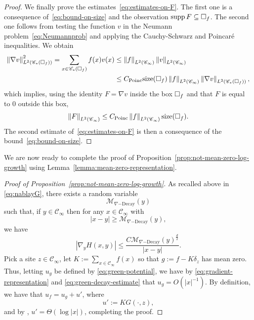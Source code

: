 \documentclass[12pt]{amsart}
\numberwithin{equation}{section}
\begin{document}
\begin{proof}
		We finally prove the estimates~\eqref{eq:estimates-on-F}. The first one is a consequence of~\eqref{eq:bound-on-size} and the observation $\mathrm{supp\,} F \subseteq \square_f$. The second one follows from testing the function $v$ in the Neumann problem~\eqref{eq:Neumannprob} and applying the Cauchy-Schwarz and Poincar\'e inequalities. We obtain
		\begin{align*}
			\left\| \nabla v \right\|_{L^2 ( \mathscr{C}_*(\square_f))}^2  = \sum_{x \in \mathscr{C}_*(\square_f)} f(x) v(x) 
			& \leq \left\| f \right\|_{L^2(\mathscr{C}_\infty)} \left\| v \right\|_{L^2(\mathscr{C}_\infty)} \\
			& \leq  C_{\mathrm{Poinc}} \mathrm{size}(\square_f) \left\| f \right\|_{L^2(\mathscr{C}_\infty)} \left\| \nabla v \right\|_{L^2 ( \mathscr{C}_*(\square_f))},
		\end{align*}
		which implies, using the identity $F = \nabla v$ inside the box $\square_f$ and that $F$ is equal to $0$ outside this box,
		\begin{equation*}
			\left\| F \right\|_{L^2 ( \mathscr{C}_\infty)} \leq C_{\mathrm{Poinc}} \left\| f \right\|_{L^2(\mathscr{C}_\infty)}\mathrm{size}(\square_f).
		\end{equation*}
		The second estimate of~\eqref{eq:estimates-on-F} is then a consequence of the bound~\eqref{eq:bound-on-size}.
	\end{proof}
	
	We are now ready to complete the proof of Proposition~\ref{prop:not-mean-zero-log-growth} using Lemma~\ref{lemma:mean-zero-representation}.
	
	\begin{proof}[Proof of Proposition~\ref{prop:not-mean-zero-log-growth}]
		As recalled above in \eqref{eq:nablayG}, there exists a random variable 
		\[
		\mathcal{M}_{\nabla\mathrm{-Decay}}(y)
		\]
		such that, if $y \in \mathscr{C}_\infty$ then for any $x \in \mathscr{C}_\infty$ with 
		\[
		|x - y| \geq \mathcal{M}_{\nabla\mathrm{-Decay}}(y),
		\]
		we have 
		\begin{equation} \label{eq:green-decay-estimate}
			\left| \nabla_y H(x , y) \right| \leq \frac{C \mathcal{M}_{\nabla\mathrm{-Decay}}(y)^{\frac{d}{2}}}{|x - y|}.
		\end{equation}
		Pick a site $z \in \mathscr{C}_{\infty}$, let $K := \sum_{x \in \mathscr{C}_{\infty}} f(x)$ so that $g := f -  K \delta_z$ has mean zero. Thus, letting $u_g$ be defined by \eqref{eq:green-potential}, we have by  \eqref{eq:gradient-representation} and \eqref{eq:green-decay-estimate} that $u_g = O(|x|^{-1})$. By definition, we have that $u_f = u_g + u'$, where 
		\[
		u' :=  K  G(\cdot , z),
		\]
		and by \cite[Theorem 2]{dario-gu-green}, $u' = \Theta(\log |x|)$, completing the proof. 
	\end{proof}
	
\end{document}
